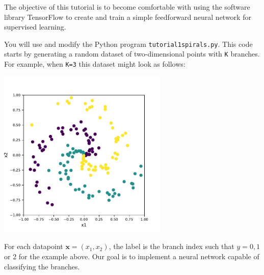 \documentclass[letterpaper]{scrartcl}
\begin{document}

\vspace{-3cm}



\maketitle

The objective of this tutorial is to become comfortable with using the software library TensorFlow to 
create and train a simple feedforward neural network for supervised learning.

You will use and modify the Python program \texttt{tutorial1{\textunderscore}spirals.py}.
This code starts by generating a random dataset of two-dimensional points with \texttt{K} branches.
For example, when \texttt{K=3} this dataset might look as follows:
\vspace{-3mm}
\begin{center}
\includegraphics[width=8.1cm]{spiral_data.pdf}
\end{center}
For each datapoint $\mathbf{x} = (x_1, x_2)$, the label is the branch index such that $y = 0, 1$ or 2 for the example above.
Our goal is to implement a neural network capable of classifying the branches.
\end{document}
